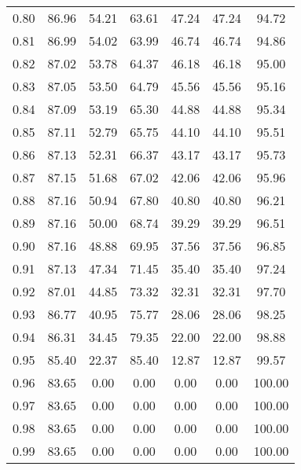 \begin{tabular}{|c|c|c|c|c|c|c|}
      0.80 &     86.96 &     54.21 &      63.61 &   47.24 &      47.24 &         94.72 \\
      0.81 &     86.99 &     54.02 &      63.99 &   46.74 &      46.74 &         94.86 \\
      0.82 &     87.02 &     53.78 &      64.37 &   46.18 &      46.18 &         95.00 \\
      0.83 &     87.05 &     53.50 &      64.79 &   45.56 &      45.56 &         95.16 \\
      0.84 &     87.09 &     53.19 &      65.30 &   44.88 &      44.88 &         95.34 \\
      0.85 &     87.11 &     52.79 &      65.75 &   44.10 &      44.10 &         95.51 \\
      0.86 &     87.13 &     52.31 &      66.37 &   43.17 &      43.17 &         95.73 \\
      0.87 &     87.15 &     51.68 &      67.02 &   42.06 &      42.06 &         95.96 \\
      0.88 &     87.16 &     50.94 &      67.80 &   40.80 &      40.80 &         96.21 \\
      0.89 &     87.16 &     50.00 &      68.74 &   39.29 &      39.29 &         96.51 \\
      0.90 &     87.16 &     48.88 &      69.95 &   37.56 &      37.56 &         96.85 \\
      0.91 &     87.13 &     47.34 &      71.45 &   35.40 &      35.40 &         97.24 \\
      0.92 &     87.01 &     44.85 &      73.32 &   32.31 &      32.31 &         97.70 \\
      0.93 &     86.77 &     40.95 &      75.77 &   28.06 &      28.06 &         98.25 \\
      0.94 &     86.31 &     34.45 &      79.35 &   22.00 &      22.00 &         98.88 \\
      0.95 &     85.40 &     22.37 &      85.40 &   12.87 &      12.87 &         99.57 \\
      0.96 &     83.65 &      0.00 &       0.00 &    0.00 &       0.00 &        100.00 \\
      0.97 &     83.65 &      0.00 &       0.00 &    0.00 &       0.00 &        100.00 \\
      0.98 &     83.65 &      0.00 &       0.00 &    0.00 &       0.00 &        100.00 \\
      0.99 &     83.65 &      0.00 &       0.00 &    0.00 &       0.00 &        100.00 \\
\bottomrule
\end{tabular}
